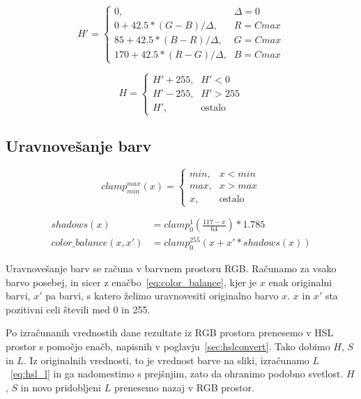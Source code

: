 \begin{equation}
H' =
\begin{cases}
    0 \text{,}& \Delta = 0 \\
    0 + 42.5 * (G - B) / \Delta \text{,}& R = Cmax \\
    85 + 42.5 * (B - R) / \Delta \text{,}& G = Cmax \\
    170 + 42.5 * (R - G) / \Delta \text{,}& B = Cmax
\end{cases}
\end{equation}

\begin{equation}
H =
\begin{cases}
    H' + 255 \text{,}& H' < 0 \\
    H' - 255 \text{,}& H' > 255 \\
    H' \text{,}& \text{ostalo}
\end{cases}
\end{equation}


\subsection{Uravnovešanje barv}
\label{sec:obdelavaSlikUravnovesanjeBarv}

\begin{equation}
clamp_{min}^{max}(x) =
\begin{cases}
    min \text{,}& x < min \\
    max \text{,}& x > max \\
    x \text{,}& \text{ostalo}
\end{cases}
\end{equation}

\begin{align}
shadows(x) &= clamp_{0}^{1}(\frac{117 - x}{64}) * 1.785 \\
color\_balance(x, x') &= clamp_{0}^{255}(x + x' * shadows(x)) \label{eq:color_balance}
\end{align}

Uravnovešanje barv se računa v barvnem prostoru RGB. Računamo za vsako
barvo posebej, in sicer z enačbo~\eqref{eq:color_balance}, kjer je $x$ enak
originalni barvi, $x'$ pa barvi, s katero želimo uravnovesiti originalno barvo
$x$. $x$ in $x'$ sta pozitivni celi števili med 0 in 255.

Po izračunanih vrednostih dane rezultate iz RGB prostora prenesemo v HSL
prostor s pomočjo enačb, napisnih v poglavju~\ref{sec:hslconvert}. Tako dobimo $H$,
$S$ in $L$. Iz originalnih vrednosti, to je vrednost barve na sliki,
izračunamo $L$~\ref{eq:hsl_l} in ga nadomestimo s prejšnjim, zato da ohranimo
podobno svetlost. $H$, $S$ in novo pridobljeni $L$ prenesemo nazaj v RGB
prostor.


